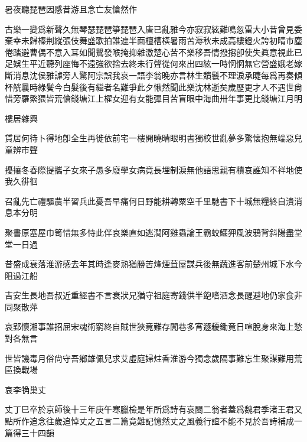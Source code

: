 \documentclass{zhvt-classic-Miya}
\begin{document}
\begin{fw}暑夜聽琵琶因感昔游且念亡友愴然作\end{fw}

古樂一變爲新聲久無琴瑟琵琶箏琵琶入唐已亂雅今亦寂寂絃難鳴忽雷大小昔曾見委棄幸未歸榛荆縱張伎舞盛歌拍誰遮半面檀槽橫暑雨苦溽秋未成高樓鐙火誇初晴市塵倦踏避曹偶不意入耳如聞鸎發喉掩抑雜激楚心苦不樂移吾情撥搊卽使失眞意視此已足娛生平近聽列座悔不遠強欲捨去終未行聲從何來出四絃一時惘惘無它營盛娥老嫁斷消息沈侯雅謔旁人驚阿宗誤我哀一語李翁晚亦言林生穨鬟不理淚承睫每爲再奏傾杯觥曩時綠鬢今白髮後有繼者名難爭此夕愀然聞此樂沈林逝矣歲歷更才人不遇世尙惜旁羅繁猥皆荒傖錢塘江上櫂女迎有女能彈目苦盲眼中海曲卅年事更比錢塘江月明

\begin{fw}樓居雜興\end{fw}

賃居何待卜得地卽全生再徙依前宅一樓開曉晴眼明書獨校世亂夢多驚懷抱無端惡兒童辨市聲

擾攘冬春際提攜子女來子愚多廢學女病竟長埋制淚無他語思親有積哀誰知不祥地使我久徘徊

召亂先亡禮驅農半習兵此憂吾早痛何日野能耕轉粟空千里馳書下十城無糧終自潰消息本分明

聚書原塞屋巾笥惜無多恃此伴哀樂直如逃澗阿雞蟲論王霸蛟鱷狎風波鴉背斜陽盡堂堂一日過

昔盛成衰落淮游感去年其時逢麥熟猶勝苦烽煙葺屋謀兵後無蔬進客前楚州城下水今阻過江船

吉安生長地吾叔近重經書不言衰狀兄猶守祖庭寄錢供半飽嗜酒念長醒避地仍家食非同聚散萍

哀郢懷湘事誰招屈宋魂術窮終自賊世狹竟難存閭巷多宵遯耰鋤竟日喧脫身來海上愁對各無言

世皆譏毒月俗尙守吾鄕雄佩兒求艾虛庭婦炷香淮游今獨念歲隔事難忘生聚謀難用荒區換戰場

\begin{fw}哀李觕巢丈\end{fw}

丈丁巳卒於京師後十三年庚午寒臘檢是年所爲詩有哀閩二翁者蓋爲魏君季渚王君又點所作追念往歲追悼丈之五言二篇竟難記憶然丈之風義行誼不能不見於吾詩補成一篇得三十四韻
\end{document}
